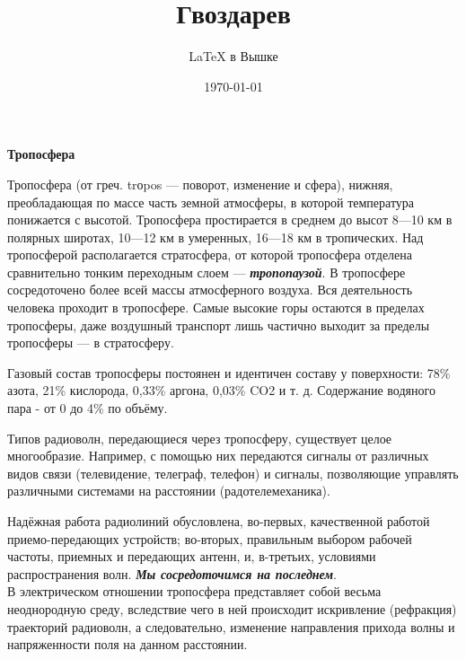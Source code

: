 \documentclass[a4paper,12pt]{article} %
\author{\LaTeX{} в Вышке}
\title{Гвоздарев}
\date{\today}
\begin{document}

\begin{flushright}
\large{\textbf{Тропосфера}}
\end{flushright}

Тропосфера (от греч. trоpos — поворот, изменение и сфера), нижняя, преобладающая по массе часть земной атмосферы, в которой температура понижается с высотой. Тропосфера простирается в среднем до высот 8—10 км в полярных широтах, 10—12 км в умеренных, 16—18 км в тропических. Над тропосферой располагается стратосфера, от которой тропосфера отделена сравнительно тонким переходным слоем — \textbf{\textsl{тропопаузой}}. В тропосфере сосредоточено более всей массы атмосферного воздуха. Вся деятельность человека проходит в тропосфере. Самые высокие горы остаются в пределах тропосферы, даже воздушный транспорт лишь частично выходит за пределы тропосферы — в стратосферу. \

Газовый состав тропосферы постоянен и идентичен сос­таву у поверхности: 78\% азота, 21\% кислорода, 0,33\% аргона, 0,03\% CO2 и т. д. Содержание водяного пара - от 0 до 4\% по объ­ёму. \

Типов радиоволн, передающиеся через тропосферу, существует целое многообразие. Например, с помощью них передаются сигналы от различных видов связи (телевидение, телеграф, телефон) и сигналы, позволяющие управлять различными системами на расстоянии (радотелемеханика). \

Надёжная работа радиолиний обусловлена, во-первых, качественной работой приемо-передающих устройств; во-вторых, правильным выбором рабочей частоты, приемных и передающих антенн, и, в-третьих, условиями распространения волн. \textbf{\textsl{Мы сосредоточимся на последнем}}. \\

%

В электрическом отношении тропосфера представляет собой весьма неоднородную среду, вследствие чего в ней происходит искривление (рефракция) траекторий радиоволн, а следовательно, изменение направления прихо­да волны и напряженности поля на данном расстоянии.
\end{document}
